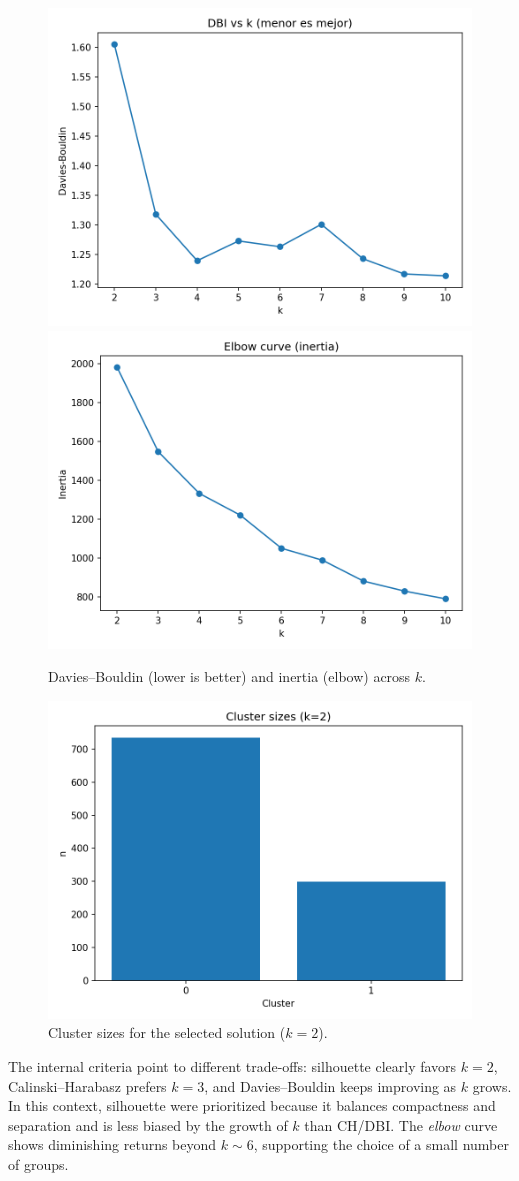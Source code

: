\documentclass[journal]{IEEEtran}
\begin{document}
\begin{figure}[htbp]
	\centering
	\includegraphics[width=.48\linewidth]{assets/dbi_vs_k.png}\hfill
	\includegraphics[width=.48\linewidth]{assets/elbow_inertia.png}
	\caption{Davies--Bouldin (lower is better) and inertia (elbow) across $k$.}
	\label{fig:dbi-kmeans}\label{fig:elbow-kmeans}
\end{figure}

\begin{figure}[htbp]
	\centering
	\includegraphics[width=.55\linewidth]{assets/cluster_sizes_k2.png}
	\caption{Cluster sizes for the selected solution ($k{=}2$).}
	\label{fig:sizes-k2}
\end{figure}
The internal criteria point to different trade-offs:
silhouette clearly favors \textbf{$k{=}2$}, Calinski--Harabasz prefers \textbf{$k{=}3$},
and Davies--Bouldin keeps improving as $k$ grows. In this context, 
silhouette were prioritized because it balances compactness and separation and is less biased by the growth
of $k$ than CH/DBI. The \emph{elbow} curve shows diminishing returns beyond $k{\sim}6$,
supporting the choice of a small number of groups.
\end{document}
